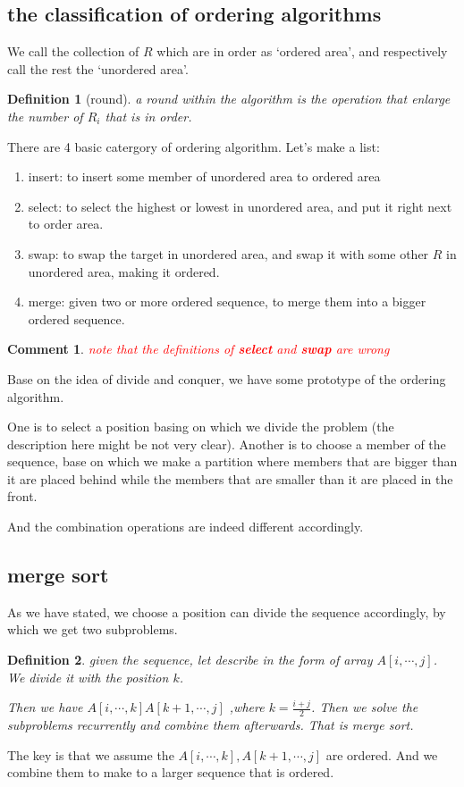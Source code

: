 \documentclass[a4paper, 10pt]{ctexart} %
\newtheorem{definition}{Definition}
\newtheorem{corollary}{Comment}
\begin{document}
\subsection{the classification of ordering algorithms}
We call the collection of $R$ which are in order as `ordered area', and respectively call the rest the `unordered area'. 

\begin{definition}[round] 
    a round within the algorithm is the operation that enlarge the number of $R_{i}$ that is in order.
\end{definition}

There are 4 basic catergory of ordering algorithm. Let's make a list: 
\begin{enumerate}
    \item insert: to insert some member of unordered area to ordered area
    \item select: to select the highest or lowest in unordered area, and put it right next to order area.
    \item swap: to swap the target in unordered area, and swap it with some other $R$ in unordered area, making it ordered.
    \item merge: given two or more ordered sequence, to merge them into a bigger ordered sequence.
\end{enumerate}
\begin{corollary}
\textcolor{red}{note that the definitions of {\bfseries select} and {\bfseries swap} are wrong}
\end{corollary}

Base on the idea of divide and conquer, we have some prototype of the ordering algorithm. 

One is to select a position basing on which we divide the problem (the description here might be not very clear). 
Another is to choose a member of the sequence, base on which we make a partition where
members that are bigger than it are placed behind while the members that are smaller than it 
are placed in the front.

And the combination operations are indeed different accordingly. 

\subsection{merge sort}
As we have stated, we choose a position can divide the sequence accordingly, by which we get two 
subproblems. 
\begin{definition}
    given the sequence, let describe in the form of array
    $A[i,\cdots, j]$. We divide it with the position $k$. 

    Then we have $A[ i, \cdots    , k  ] A \left[  k + 1 ,  \cdots  , j\right]$ ,where $k  = \displaystyle  \frac{ i  +j}{ 2}$. Then we solve  the subproblems
    recurrently and combine them afterwards. That is merge sort.
\end{definition}
\noindent The key is that we assume the 
$A\left[ i , \cdots ,k \right] , A[k+1 , \cdots  ,j]$ are ordered. And we combine them to make to 
a larger sequence that is ordered.
\end{document}
